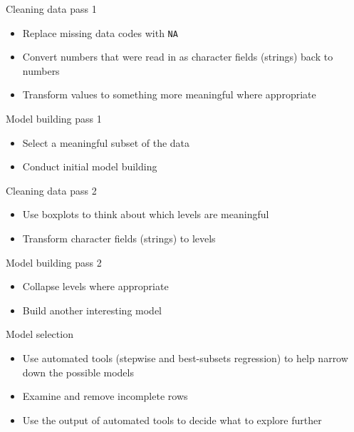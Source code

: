 \documentclass{beamer}\usepackage[]{graphicx}\usepackage[]{color}
\begin{document}
\begin{darkframes}
    \begin{frame}{Cleaning data pass 1}
      \begin{itemize}
        \item Replace missing data codes with \texttt{NA}
        \item Convert numbers that were read in as character fields (strings) back to numbers
        \item Transform values to something more meaningful where appropriate
      \end{itemize}
    \end{frame}

    \begin{frame}{Model building pass 1}
      \begin{itemize}
        \item Select a meaningful subset of the data
        \item Conduct initial model building
      \end{itemize}
    \end{frame}

    \begin{frame}{Cleaning data pass 2}
      \begin{itemize}
        \item Use boxplots to think about which levels are meaningful
        \item Transform character fields (strings) to levels
      \end{itemize}
    \end{frame}

    \begin{frame}{Model building pass 2}
      \begin{itemize}
        \item Collapse levels where appropriate
        \item Build another interesting model
      \end{itemize}
    \end{frame}

    \begin{frame}{Model selection}
      \begin{itemize}
        \item Use automated tools (stepwise and best-subsets regression) to help narrow down the possible models
        \item Examine and remove incomplete rows
        \item Use the output of automated tools to decide what to explore further
      \end{itemize}
    \end{frame}
  \end{darkframes}
\end{document}
